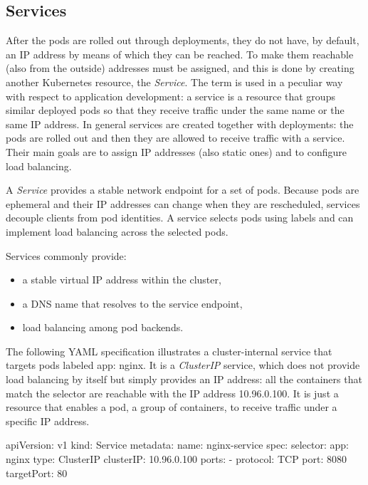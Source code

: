 \subsection{Services}

After the pods are rolled out through deployments, they do not have, by default, an IP address by means of which they can be reached. To make them reachable (also from the outside) addresses must be assigned, and this is done by creating another Kubernetes resource, the \emph{Service}. The term is used in a peculiar way with respect to application development: a service is a resource that groups similar deployed pods so that they receive traffic under the same name or the same IP address. In general services are created together with deployments: the pods are rolled out and then they are allowed to receive traffic with a service. Their main goals are to assign IP addresses (also static ones) and to configure load balancing.

A \emph{Service} provides a stable network endpoint for a set of pods. Because pods are ephemeral and their IP addresses can change when they are rescheduled, services decouple clients from pod identities. A service selects pods using labels and can implement load balancing across the selected pods.

Services commonly provide:

\begin{itemize}
\item a stable virtual IP address within the cluster,
\item a DNS name that resolves to the service endpoint,
\item load balancing among pod backends.
\end{itemize}

The following YAML specification illustrates a cluster-internal service that targets pods labeled app: nginx. It is a \emph{ClusterIP} service, which does not provide load balancing by itself but simply provides an IP address: all the containers that match the selector are reachable with the IP address 10.96.0.100. It is just a resource that enables a pod, a group of containers, to receive traffic under a specific IP address.

\begin{codeblock}
apiVersion: v1
kind: Service
metadata:
  name: nginx-service
spec:
  selector:
    app: nginx
  type: ClusterIP
  clusterIP: 10.96.0.100
  ports:
    - protocol: TCP
      port: 8080
      targetPort: 80
\end{codeblock}

